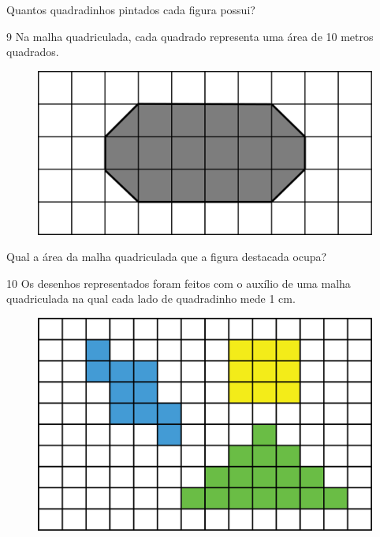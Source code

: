 Quantos quadradinhos pintados cada figura possui?




\num{9} Na malha quadriculada, cada quadrado representa uma área de 10 metros quadrados.

\begin{figure}[htpb!]
\centering
\includegraphics[width=.6\textwidth]{./media/image60.png}
\end{figure}

Qual a área da malha quadriculada que a figura destacada ocupa?



\num{10} Os desenhos representados foram feitos com o auxílio de uma malha
quadriculada na qual cada lado de quadradinho mede 1 cm.

\begin{figure}[htpb!]
\includegraphics[width=\textwidth]{./media/image57.png}
\end{figure}

